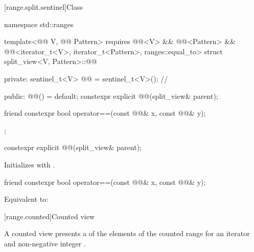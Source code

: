 [range.split.sentinel]{Class }

\begin{codeblock}
namespace std::ranges {
  template<@@ V, @@ Pattern>
    requires @@<V> && @@<Pattern> &&
             @@<iterator_t<V>, iterator_t<Pattern>, ranges::equal_to>
  struct split_view<V, Pattern>::@@ {
  private:
    sentinel_t<V> @@ = sentinel_t<V>();               // \expos

  public:
    @@() = default;
    constexpr explicit @@(split_view& parent);

    friend constexpr bool operator==(const @@& x, const @@& y);
  };
}
\end{codeblock}

\begin{itemdecl}
constexpr explicit @@(split_view& parent);
\end{itemdecl}

\begin{itemdescr}
\pnum
\effects
Initializes  with .
\end{itemdescr}

\begin{itemdecl}
friend constexpr bool operator==(const @@& x, const @@& y);
\end{itemdecl}

\begin{itemdescr}
\pnum
\effects
Equivalent to: 
\end{itemdescr}

[range.counted]{Counted view}

\pnum
{}%
A counted view presents a  of the elements
of the counted range 
for an iterator  and non-negative integer .

